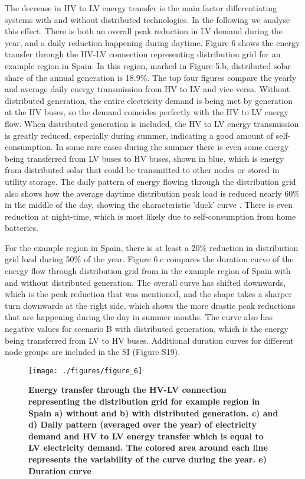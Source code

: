 \documentclass[review]{elsarticle}
\begin{document}
The decrease in HV to LV energy transfer is the main factor differentiating systems with and without distributed technologies. In the following we analyse this effect. There is both an overall peak reduction in LV demand during the year, and a daily reduction happening during daytime. Figure 6 shows the energy transfer through the HV-LV connection representing distribution grid for an example region in Spain. In this region, marked in Figure 5.b, distributed solar share of the annual generation is 18.9\%. The top four figures compare the yearly and average daily energy transmission from HV to LV and vice-versa. Without distributed generation, the entire electricity demand is being met by generation at the HV buses, so the demand coincides perfectly with the HV to LV energy flow. When distributed generation is included, the HV to LV energy transmission is greatly reduced, especially during summer, indicating a good amount of self-consumption. In some rare cases during the summer there is even some energy being transferred from LV buses to HV buses, shown in blue, which is energy from distributed solar that could be transmitted to other nodes or stored in utility storage. The daily pattern of energy flowing through the distribution grid also shows how the average daytime distribution peak load is reduced nearly 60\% in the middle of the day, showing the characteristic 'duck' curve \cite{denholm2008production,  caiso2016duck}. There is even reduction at night-time, which is most likely due to self-consumption from home batteries.

For the example region in Spain, there is at least a 20\% reduction in distribution grid load during 50\% of the year. Figure 6.c compares the duration curve of the energy flow through distribution grid from in the example region of Spain with and without distributed generation. The overall curve has shifted downwards, which is the peak reduction that was mentioned, and the shape takes a sharper turn downwards at the right side, which shows the more drastic peak reductions that are happening during the day in summer months. The curve also has negative values for scenario B with distributed generation, which is the energy being transferred from LV to HV buses. Additional duration curves for different node groups are included in the SI (Figure S19).
\begin{figure}
   \texttt{[image: ./figures/figure\_6]}
   \caption{\textbf{Energy transfer through the HV-LV connection representing the distribution grid for example region in Spain a) without and b) with distributed generation. c) and d) Daily pattern (averaged over the year) of electricity demand and HV to LV energy transfer which is equal to LV electricity demand. The colored area around each line represents the variability of the curve during the year. e) Duration curve}}
   \label{fig:duration}
\end{figure}
\end{document}
